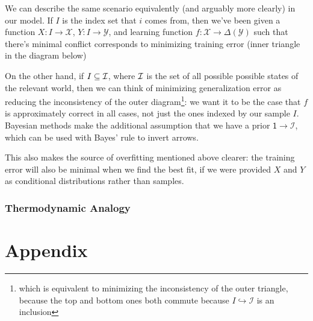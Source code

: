 \documentclass{article}
\begin{document}
	We can describe the same scenario equivalently (and arguably more clearly) in our model. If $I$ is the index set that $i$ comes from, then we've been given a function $X : I \to \mathcal X$, $Y: I \to \mathcal Y$, and learning function $f : \mathcal X \to \Delta(\mathcal Y)$ such that there's minimal conflict corresponds to minimizing training error (inner triangle in the diagram below)
	
	\begin{center}
	\end{center}

	On the other hand, if $I \subseteq \cal I$, where $\cal I$ is the set of all possible possible states of the relevant world, then we can think of minimizing generalization error as reducing the inconsistency of the outer diagram\footnote{which is equivalent to minimizing the inconsistency of the outer triangle, because the top and bottom ones both commute because $I \hookrightarrow \mathcal I$ is an inclusion}: we want it to be the case that $f$ is approximately correct in all cases, not just the ones indexed by our sample $I$.  Bayesian methods make the additional assumption that we have a prior $\mathsf 1 \to \mathcal I$, which can be used with Bayes' rule to invert arrows.
	
	This also makes the source of overfitting mentioned above clearer: the training error will also be minimal when we find the best fit, if we were provided $X$ and $Y$ as conditional distributions rather than samples.
	
	\section{Thermodynamic Analogy}
	
	

	\part*{Appendix}
	\appendix
\end{document}

